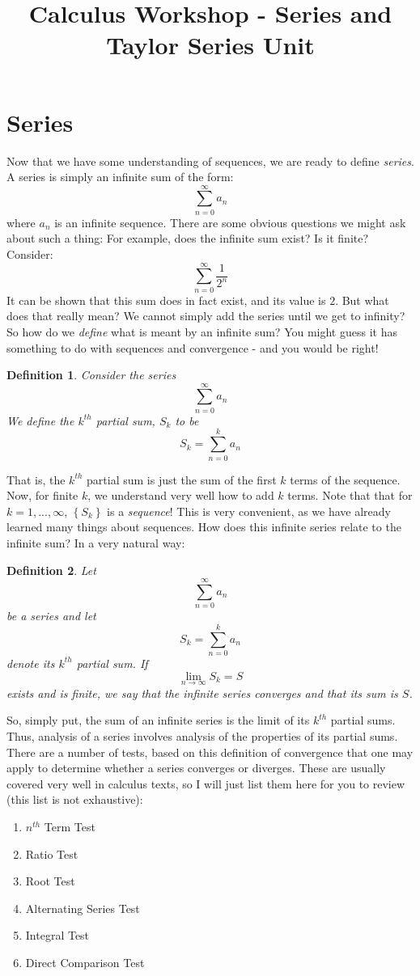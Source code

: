\documentclass[12pt,a4paper]{article} %
\title{Calculus Workshop - Series and Taylor Series Unit}
\newtheorem{defn}{Definition}
\begin{document}
\maketitle
\section{Series}
Now that we have some understanding of sequences, we are ready to define \emph{series}.  A series is simply an infinite sum of the form:
$$\sum_{n=0}^\infty a_n$$
where $a_n$ is an infinite sequence.  There are some obvious questions we might ask about such a thing: For example, does the infinite sum exist?  Is it finite?  Consider:
$$\sum_{n=0}^\infty \frac1{2^n}$$
It can be shown that this sum does in fact exist, and its value is $2$.  But what does that really mean?  We cannot simply add the series until we get to infinity?  So how do we \emph{define} what is meant by an infinite sum?  You might guess it has something to do with sequences and convergence - and you would be right!  
\begin{defn}
Consider the series
$$\sum_{n=0}^\infty a_n$$
We define the $k^{th}$ partial sum, $S_k$ to  be
$$S_k=\sum_{n=0}^k a_n$$ 
\end{defn}
That is, the $k^{th}$ partial sum is just the sum of the first $k$ terms of the sequence.  Now, for finite $k$, we understand very well how to add $k$ terms.  Note that that for $k=1,...,\infty$, $\left\{S_k\right\}$ is a \emph{sequence}!  This is very convenient, as we have already learned many things about sequences.  How does this infinite series relate to the infinite sum? In a very natural way:
\begin{defn}
Let $$\sum_{n=0}^\infty a_n$$ be a series and let 
$$S_k=\sum_{n=0}^k a_n$$  denote its $k^{th}$ partial sum.  If $$\lim_{n\rightarrow\infty} S_k = S$$ exists and is finite, we say that the infinite series \emph{converges} and that its sum is $S$.
\end{defn}
So, simply put, the sum of an infinite series is the limit of its $k^{th}$ partial sums.  Thus, analysis of a series involves analysis of the properties of its partial sums.  There are a number of tests, based on this definition of convergence that one may apply to determine whether a series converges or diverges.  These are usually covered very well in calculus texts, so I will just list them here for you to review (this list is not exhaustive):
\begin{enumerate}
\item $n^{th}$ Term Test
\item Ratio Test
\item Root Test
\item Alternating Series Test
\item Integral Test
\item Direct Comparison Test
\end{enumerate}
\end{document}
